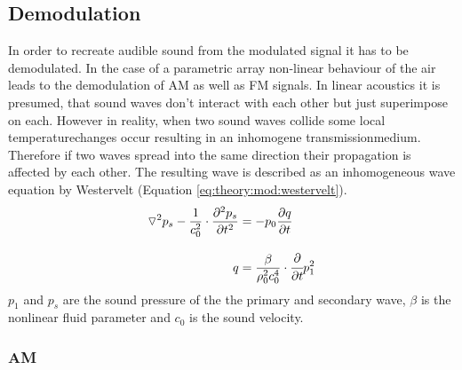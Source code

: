 \subsection{Demodulation}

In order to recreate audible sound from the modulated signal it has to be demodulated. In the case of a parametric array non-linear behaviour of the air leads to the demodulation of AM as well as FM signals.\p
%
In linear acoustics it is presumed, that sound waves don't interact with each other but just superimpose on each. However in reality, when two sound waves collide some local temperaturechanges occur resulting in an inhomogene transmissionmedium. Therefore if two waves spread into the same direction their propagation is affected by each other. The resulting wave is described as an inhomogeneous wave equation by Westervelt (Equation \ref{eq:theory:mod:westervelt}).\cite{westervelt_parametric_1963}\cite{yoneyama_audio_1983}
%
\begin{align}
  \triangledown^2 p_s - \frac{1}{c_0^2} \cdot \frac{\partial^2 p_s}{\partial t^2} & = - p_0 \frac{\partial q}{\partial t}\label{eq:theory:mod:westervelt}\pmath
  q &= \frac{\beta}{\rho_0^2 c_0^4} \cdot \cfrac{\partial }{\partial t} p_1^2 \label{eq:theory:mod:westervelt_q}
\end{align}
%
$p_1$ and $p_s$ are the sound pressure of the the primary and secondary wave, $\beta$ is the nonlinear fluid parameter and $c_0$ is the sound velocity.

\subsubsection*{AM}

